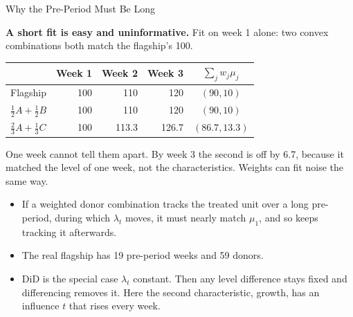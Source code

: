 \documentclass[aspectratio=169, 11pt, handout]{beamer}
\begin{document}
\begin{frame}{Why the Pre-Period Must Be Long}

\textbf{A short fit is easy and uninformative.} Fit on week 1 alone: two convex combinations both match the flagship's 100.

\begin{center}
\small
\begin{tabular}{lrrrc}
\toprule
& \textbf{Week 1} & \textbf{Week 2} & \textbf{Week 3} & $\sum_j w_j\mu_j$ \\
\midrule
Flagship & 100 & 110 & 120 & $(90, 10)$ \\
$\tfrac12 A + \tfrac12 B$ & 100 & 110 & 120 & $(90, 10)$ \\
$\tfrac23 A + \tfrac13 C$ & 100 & 113.3 & 126.7 & $(86.7, 13.3)$ \\
\bottomrule
\end{tabular}
\end{center}

One week cannot tell them apart. By week 3 the second is off by 6.7, because it matched the level of one week, not the characteristics. Weights can fit noise the same way.

\medskip

\begin{itemize}
  \item If a weighted donor combination tracks the treated unit over a long pre-period, during which $\lambda_t$ moves, it must nearly match $\mu_1$, and so keeps tracking it afterwards.
  \item The real flagship has 19 pre-period weeks and 59 donors.
  \item DiD is the special case $\lambda_t$ constant. Then any level difference stays fixed and differencing removes it. Here the second characteristic, growth, has an influence $t$ that rises every week.
\end{itemize}
\end{frame}
\end{document}
